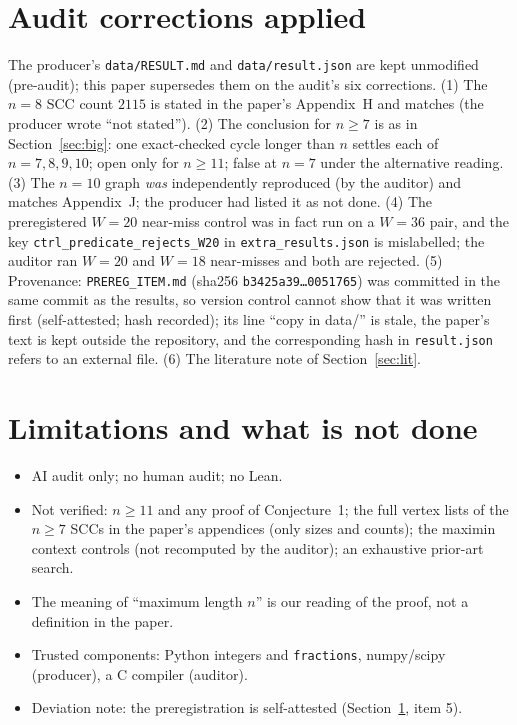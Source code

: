 \documentclass[10pt]{article}
\begin{document}
\section{Audit corrections applied}\label{sec:corr}
The producer's \texttt{data/RESULT.md} and \texttt{data/result.json} are kept unmodified (pre-audit); this paper supersedes them on the audit's six corrections. (1) The $n=8$ SCC count $2115$ is stated in the paper's Appendix~H and matches (the producer wrote ``not stated''). (2) The conclusion for $n\ge7$ is as in Section~\ref{sec:big}: one exact-checked cycle longer than $n$ settles each of $n=7,8,9,10$; open only for $n\ge11$; false at $n=7$ under the alternative reading. (3) The $n=10$ graph \emph{was} independently reproduced (by the auditor) and matches Appendix~J; the producer had listed it as not done. (4) The preregistered $W=20$ near-miss control was in fact run on a $W=36$ pair, and the key \texttt{ctrl\_predicate\_rejects\_W20} in \texttt{extra\_results.json} is mislabelled; the auditor ran $W=20$ and $W=18$ near-misses and both are rejected. (5) Provenance: \texttt{PREREG\_ITEM.md} (sha256 \texttt{b3425a39\dots 0051765}) was committed in the same commit as the results, so version control cannot show that it was written first (self-attested; hash recorded); its line ``copy in data/'' is stale, the paper's text is kept outside the repository, and the corresponding hash in \texttt{result.json} refers to an external file. (6) The literature note of Section~\ref{sec:lit}.

\section{Limitations and what is not done}\label{sec:lim}
\begin{itemize}\itemsep=1pt
\item AI audit only; no human audit; no Lean.
\item Not verified: $n\ge11$ and any proof of Conjecture~1; the full vertex lists of the $n\ge7$ SCCs in the paper's appendices (only sizes and counts); the maximin context controls (not recomputed by the auditor); an exhaustive prior-art search.
\item The meaning of ``maximum length $n$'' is our reading of the proof, not a definition in the paper.
\item Trusted components: Python integers and \texttt{fractions}, numpy/scipy (producer), a C compiler (auditor).
\item Deviation note: the preregistration is self-attested (Section~\ref{sec:corr}, item 5).
\end{itemize}
\end{document}
